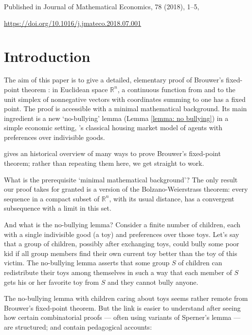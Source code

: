 \documentclass[english, 11pt]{article}
\theoremstyle{plain} %
\theoremstyle{definition}
\begin{document}
\bigskip
{}


\bigskip \noindent Published in Journal of Mathematical Economics, 78 (2018), 1--5, 

\url{https://doi.org/10.1016/j.jmateco.2018.07.001}

\newpage
\section{Introduction}

The aim of this paper is to give a detailed, elementary proof of Brouwer's fixed-point theorem \citep[Satz 4]{Brouwer1911}: in Euclidean space $\mathbb{R}^n$, a continuous function from and to the unit simplex of nonnegative vectors with coordinates summing to one has a fixed point. The proof is accessible with a minimal mathematical background. Its main ingredient is a new `no-bullying' lemma (Lemma \ref{lemma: no bullying}) in a simple economic setting, \citeauthor{ShapleyScarf1974}'s \citeyearpar{ShapleyScarf1974} classical housing market model of agents with preferences over indivisible goods.

\cite{Park1999} gives an historical overview of many ways to prove Brouwer's fixed-point theorem; rather than repeating them here, we get straight to work.

What is the prerequisite `minimal mathematical background'? The only result our proof takes for granted is a version of the Bolzano-Weierstrass theorem: every sequence in a compact subset of $\mathbb{R}^n$, with its usual distance, has a convergent subsequence with a limit in this set.

And what is the no-bullying lemma? Consider a finite number of children, each with a single indivisible good (a toy) and preferences over those toys. Let's say that a group of children, possibly after exchanging toys, could bully some poor kid if all group members find their own current toy better than the toy of this victim. The no-bullying lemma asserts that some group $S$ of children can redistribute their toys among themselves in such a way that each member of $S$ gets his or her favorite toy from $S$ and they cannot bully anyone.

The no-bullying lemma with children caring about toys seems rather remote from Brouwer's fixed-point theorem. But the link is easier to understand after seeing how certain combinatorial proofs --- often using variants of Sperner's lemma \citep{Sperner1928} --- are structured; \citet[sec. 3]{Scarf1982} and \citet[Ch. 3--6]{Border1985} contain pedagogical accounts:
\end{document}
